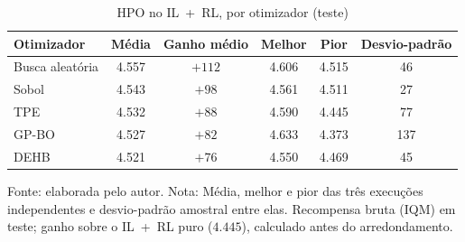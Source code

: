 \begin{table}[htbp]
\centering
\small\setlength{\tabcolsep}{2pt}
\caption{HPO no IL~+~RL, por otimizador (teste)}
\label{tab:agregado}
\begin{tabular}{l c c c c c}
\hline
\textbf{Otimizador} & \textbf{Média} & \textbf{Ganho médio} & \textbf{Melhor} & \textbf{Pior} & \textbf{Desvio-padrão} \\ \hline
Busca aleatória & 4.557 & $+112$ & 4.606 & 4.515 & 46 \\
Sobol & 4.543 & $+98$ & 4.561 & 4.511 & 27 \\
TPE & 4.532 & $+88$ & 4.590 & 4.445 & 77 \\
GP-BO & 4.527 & $+82$ & 4.633 & 4.373 & 137 \\
DEHB & 4.521 & $+76$ & 4.550 & 4.469 & 45 \\
\hline
\end{tabular}

{\footnotesize Fonte: elaborada pelo autor. Nota: Média, melhor e pior das três execuções independentes e desvio-padrão amostral entre elas. Recompensa bruta (IQM) em teste; ganho sobre o IL~+~RL puro ($4.445$), calculado antes do arredondamento.}
\end{table}
